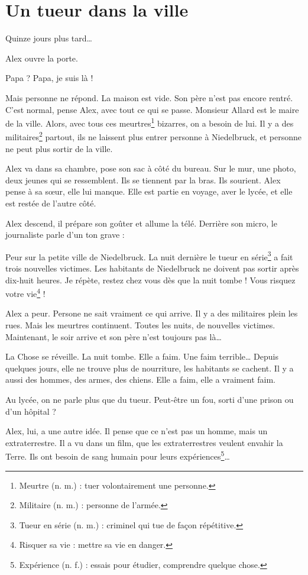 \chapter{Un tueur dans la ville}
Quinze jours plus tard\ldots{}

Alex ouvre la porte.

\og Papa ? Papa, je suis là ! \fg{}

Mais personne ne répond. La maison est vide. Son père n'est pas encore rentré. C'est normal, pense Alex, avec tout ce qui se
passe. Monsieur Allard est le maire de la ville. Alors, avec tous ces meurtres\footnote{Meurtre (n. m.) : tuer volontairement une
personne.} bizarres, on a besoin de lui. Il y a des militaires\footnote{Militaire (n. m.) : personne de l'armée.} partout, ils ne
laissent plus entrer personne à Niedelbruck, et personne ne peut plus sortir de la ville.

Alex va dans sa chambre, pose son sac à côté du bureau. Sur le mur, une photo, deux jeunes qui se ressemblent. Ils se tiennent par
la bras. Ils sourient. Alex pense à sa s\oe{}ur, elle lui manque. Elle est partie en voyage, aver le lycée, et elle est restée de
l'autre côté.

Alex descend, il prépare son goûter et allume la télé. Derrière son micro, le journaliste parle d'un ton grave :

\og Peur sur la petite ville de Niedelbruck. La nuit dernière le tueur en série\footnote{Tueur en série (n. m.) : criminel qui tue
de fa\c{c}on répétitive.} a fait trois nouvelles victimes. Les habitants de Niedelbruck ne doivent pas sortir après dix-huit
heures. Je répète, restez chez vous dès que la nuit tombe ! Vous risquez votre vie\footnote{Risquer sa vie : mettre sa vie en
danger.} !\fg{}

Alex a peur. Persone ne sait vraiment ce qui arrive. Il y a des militaires plein les rues. Mais les meurtres continuent. Toutes
les nuits, de nouvelles victimes. Maintenant, le soir arrive et son père n'est toujours pas là\ldots{}

La Chose se réveille. La nuit tombe. Elle a faim. Une faim terrible\ldots{} Depuis quelques jours, elle ne trouve plus de
nourriture, les habitants se cachent. Il y a aussi des hommes, des armes, des chiens. Elle a faim, elle a vraiment faim.

Au lycée, on ne parle plus que du tueur. Peut-être un fou, sorti d'une prison ou d'un hôpital ?

Alex, lui, a une autre idée. Il pense que ce n'est pas un homme, mais un extraterrestre. Il a vu dans un film, que les
extraterrestres veulent envahir la Terre. Ils ont besoin de sang humain pour leurs expériences\footnote{Expérience (n. f.) :
essais pour étudier, comprendre quelque chose.}\ldots{}

